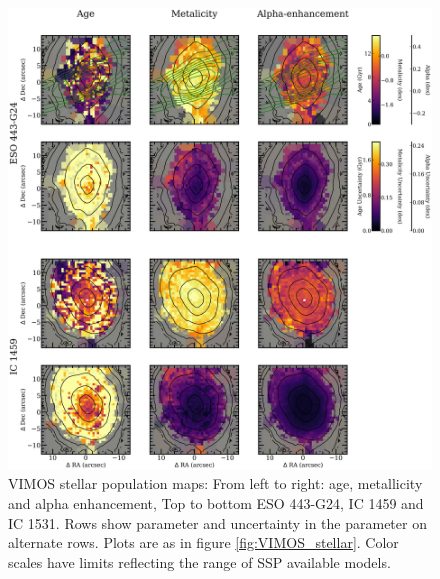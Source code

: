		\begin{figure}
			\centering
			\includegraphics[height=0.94\textheight]{chapter4/vimos/pop1.png}
			\caption[VIMOS stellar population maps]{VIMOS stellar population maps: From left to right: age, metallicity and alpha enhancement, Top to bottom ESO 443-G24, IC 1459 and IC 1531. Rows show parameter and uncertainty in the parameter on alternate rows. Plots are as in figure \ref{fig:VIMOS_stellar}. Color scales have limits reflecting the range of SSP available models.}
			\label{fig:VIMOS_pop}
		\end{figure}
